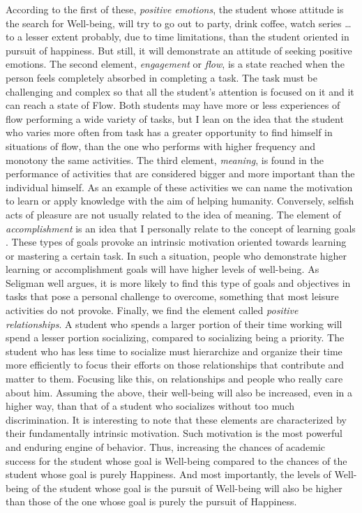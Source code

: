 \documentclass[]{book}
\begin{document}
According to the first of these, \emph{positive emotions}, the student whose attitude is the search for Well-being, will try to go out to party, drink coffee, watch series \ldots{} to a lesser extent probably, due to time limitations, than the student oriented in pursuit of happiness. But still, it will demonstrate an attitude of seeking positive emotions. The second element, \emph{engagement} or \emph{flow}, is a state reached when the person feels completely absorbed in completing a task. The task must be challenging and complex so that all the student's attention is focused on it and it can reach a state of Flow. Both students may have more or less experiences of flow performing a wide variety of tasks, but I lean on the idea that the student who varies more often from task has a greater opportunity to find himself in situations of flow, than the one who performs with higher frequency and monotony the same activities. The third element, \emph{meaning}, is found in the performance of activities that are considered bigger and more important than the individual himself. As an example of these activities we can name the motivation to learn or apply knowledge with the aim of helping humanity. Conversely, selfish acts of pleasure are not usually related to the idea of meaning. The element of \emph{accomplishment} is an idea that I personally relate to the concept of learning goals \citep{locke1990theory}. These types of goals provoke an intrinsic motivation oriented towards learning or mastering a certain task. In such a situation, people who demonstrate higher learning or accomplishment goals will have higher levels of well-being. As Seligman well argues, it is more likely to find this type of goals and objectives in tasks that pose a personal challenge to overcome, something that most leisure activities do not provoke. Finally, we find the element called \emph{positive relationships}. A student who spends a larger portion of their time working will spend a lesser portion socializing, compared to socializing being a priority. The student who has less time to socialize must hierarchize and organize their time more efficiently to focus their efforts on those relationships that contribute and matter to them. Focusing like this, on relationships and people who really care about him. Assuming the above, their well-being will also be increased, even in a higher way, than that of a student who socializes without too much discrimination. It is interesting to note that these elements are characterized by their fundamentally intrinsic motivation. Such motivation is the most powerful and enduring engine of behavior. Thus, increasing the chances of academic success for the student whose goal is Well-being compared to the chances of the student whose goal is purely Happiness. And most importantly, the levels of Well-being of the student whose goal is the pursuit of Well-being will also be higher than those of the one whose goal is purely the pursuit of Happiness.
\end{document}
